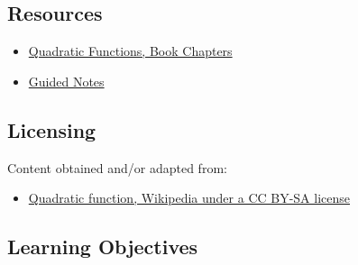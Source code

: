 \subsection{Resources}
\label{sss:reso-55b5}

\begin{itemize}
    \item \href{https://mathresearch.utsa.edu/wikiFiles/MAT1053/Quadratic_Functions/MAT1053_M2.2Quadratic_Functions.pdf}{Quadratic Functions, Book Chapters}
    \item \href{https://mathresearch.utsa.edu/wikiFiles/MAT1053/Quadratic_Functions/MAT1053_M2.2Quadratic_FunctionsGN.pdf}{Guided Notes}
\end{itemize}

\subsection{Licensing}
\label{sss:lice-7352}

Content obtained and/or adapted from:

\begin{itemize}
    \item \href{https://en.wikipedia.org/wiki/Quadratic_function}{Quadratic function, Wikipedia under a CC BY-SA license}
\end{itemize}

\subsection{Learning Objectives}
\label{ssec:lear-6e2c}

